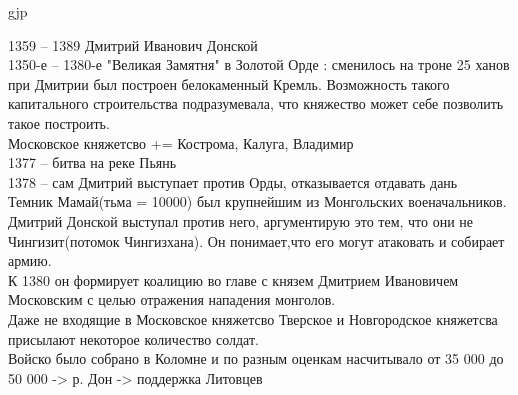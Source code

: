 gjp	 \documentclass[12pt,a4paper]{article}
\begin{document}
1359 -- 1389 Дмитрий Иванович Донской\\
1350-е -- 1380-е 	"Великая Замятня" в Золотой Орде : сменилось на троне 25 ханов\\
при Дмитрии был построен белокаменный Кремль. Возможность такого капитального строительства подразумевала, что княжество может себе позволить такое построить.\\
Московское княжетсво += Кострома, Калуга, Владимир\\ 
1377 -- битва на реке Пьянь\\
1378 -- сам Дмитрий выступает против Орды, отказывается отдавать дань	\\
Темник Мамай(тьма = 10000) был крупнейшим из Монгольских военачальников. Дмитрий Донской выступал против него, аргументирую это тем, что они не Чингизит(потомок Чингизхана). Он понимает,что его могут атаковать и собирает армию.\\
К 	1380  он формирует коалицию во главе с князем Дмитрием Ивановичем Московским с целью отражения нападения монголов.\\
Даже не входящие в Московское княжетсво Тверское и Новгородское княжетсва присылают некоторое количество солдат.\\
Войско было собрано в Коломне и по разным оценкам насчитывало от 35 000 до 50 000 -> р. Дон -> поддержка Литовцев
\end{document}
